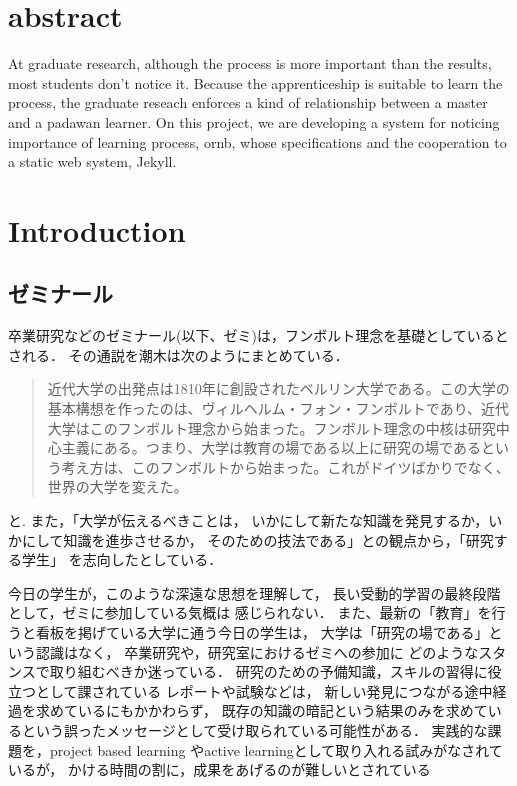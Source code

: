 \documentclass{jsarticle}
\author{\texttt{S}}
\date{}
\title{}
\begin{document}
\section{abstract}
\label{sec:org02cd473}
At graduate research,
although the process is more important than the results,
most students don't notice it.
Because the apprenticeship is suitable to learn the process,
the graduate reseach enforces a kind of
relationship between
a master and a padawan learner.
On this project,
we are developing a system for
noticing importance of learning process,
ornb, whose specifications and
the cooperation to a static web system, Jekyll.

\section{Introduction}
\label{sec:org7848552}
\subsection{ゼミナール}
\label{sec:orgaa8cf46}
卒業研究などのゼミナール(以下、ゼミ)は，フンボルト理念を基礎としているとされる．
その通説を潮木は次のようにまとめている．
\begin{quote}
近代大学の出発点は1810年に創設されたベルリン大学である。この大学の基本構想を作ったのは、ヴィルヘルム・フォン・フンボルトであり、近代大学はこのフンボルト理念から始まった。フンボルト理念の中核は研究中心主義にある。つまり、大学は教育の場である以上に研究の場であるという考え方は、このフンボルトから始まった。これがドイツばかりでなく、世界の大学を変えた。\cite{Ushiogi_column}
\end{quote}
と. また，「大学が伝えるべきことは，
いかにして新たな知識を発見するか，いかにして知識を進歩させるか，
そのための技法である」との観点から，「研究する学生」
を志向したとしている\cite{Ushiogi}．

今日の学生が，このような深遠な思想を理解して，
長い受動的学習の最終段階として，ゼミに参加している気概は
感じられない．
また、最新の「教育」を行うと看板を掲げている大学に通う今日の学生は，
大学は「研究の場である」という認識はなく，
卒業研究や，研究室におけるゼミへの参加に
どのようなスタンスで取り組むべきか迷っている．
研究のための予備知識，スキルの習得に役立つとして課されている
レポートや試験などは，
新しい発見につながる途中経過を求めているにもかかわらず，
既存の知識の暗記という結果のみを求めているという誤ったメッセージとして受け取られている可能性がある．
実践的な課題を，project based learning \cite{Bell}
やactive learningとして取り入れる試みがなされているが\cite{Settles,溝上}，
かける時間の割に，成果をあげるのが難しいとされている
\end{document}
